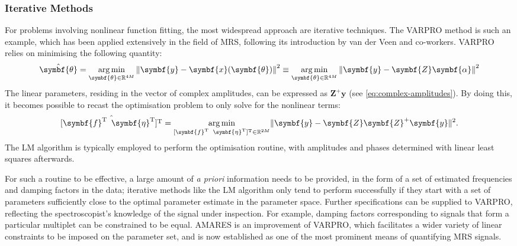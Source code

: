 \subsubsection{Iterative Methods}
For problems involving nonlinear function fitting, the most widespread approach
are iterative techniques. The \ac{VARPRO} method\cite{Golub1973} is such an
example, which has been applied extensively in the field of \ac{MRS}, following
its introduction by van der Veen and
co-workers\cite{VanDerVeen1988,Decannierec1994}. \ac{VARPRO}
relies on minimising the following quantity:
\begin{equation}
    \hat{\symbf{\theta}} = \argmin_{\symbf{\theta} \in \mathbb{R}^{4M}}
        \left \lVert \symbf{y} - \symbf{x}(\symbf{\theta}) \right \rVert^2 \equiv
        \argmin_{\symbf{\theta} \in \mathbb{R}^{4M}} \left \lVert \symbf{y} - \symbf{Z}\symbf{\alpha} \right \rVert^2
\end{equation}
The linear parameters, residing in the vector of complex amplitudes, can be
expressed as $\symbf{Z}^+\symbf{y}$ (see \cref{eq:complex-amplitudes}). By doing
this, it becomes possible to recast the optimisation problem to only solve for
the nonlinear terms:
\begin{equation}
    \hat{[\symbf{f}\T \hspace*{5pt} \symbf{\eta}\T]\T} =
        \argmin_{[\symbf{f}\T \hspace*{5pt} \symbf{\eta}\T]\T \in \mathbb{R}^{2M}}
        \lVert \symbf{y} - \symbf{Z}\symbf{Z}^+\symbf{y} \rVert^2.
\end{equation}
The \ac{LM} algorithm\cite{Levenberg1944, Marquardt1963} is
typically employed to perform the optimisation routine, with amplitudes and
phases determined with linear least squares afterwards.

For such a routine to be effective, a large amount of \textit{a priori}
information needs to be provided, in the form of a set of estimated frequencies
and damping factors in the data; iterative methods like the \ac{LM} algorithm
only tend to perform successfully if they start with a set of parameters
sufficiently close to the optimal parameter estimate in the parameter space.
Further specifications can be supplied to \ac{VARPRO}, reflecting the
spectroscopist's knowledge of the signal under inspection. For example, damping
factors corresponding to signals that form a particular multiplet can be
constrained to be equal. \Ac{AMARES} is an improvement of \ac{VARPRO}, which
facilitates a wider variety of linear constraints to be imposed on the
parameter set\cite{Vanhamme1997}, and is now established as one of the most
prominent means of quantifying \ac{MRS} signals.

